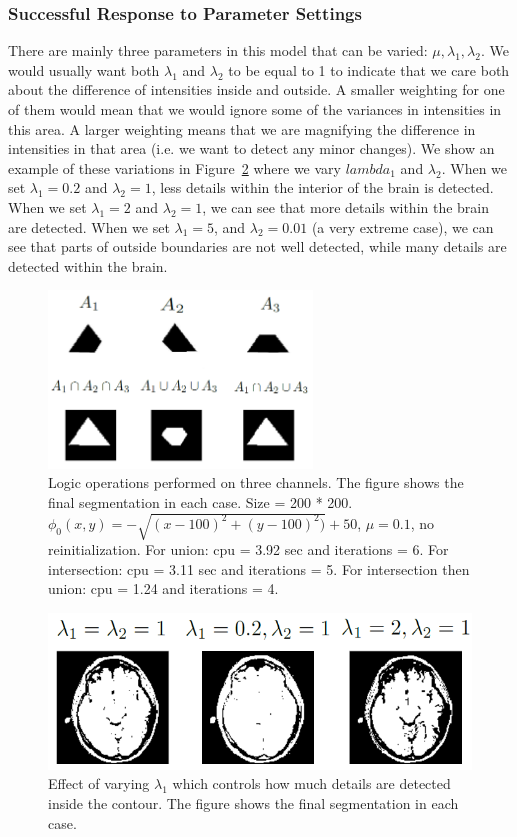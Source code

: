 \documentclass[10pt,twocolumn,letterpaper]{article}
\begin{document}
\subsubsection*{Successful Response to Parameter Settings}

There are mainly three parameters in this model that can be varied: $\mu, \lambda_{1}, \lambda_{2}$. We would usually want both $\lambda_{1}$ and $\lambda_{2}$
to be equal to 1 to indicate that we care both about the difference of intensities inside and outside. A smaller weighting for one of them would mean that we
would ignore some of the variances in intensities in this area. A larger weighting means that we are magnifying the difference in intensities in that area
(i.e. we want to detect any minor changes). We show an example of these variations in Figure~\ref{fig:cv_eg12} where we vary
$lambda_1$ and $\lambda_2$. When we set $\lambda_1 = 0.2$ and $\lambda_2 = 1$, less details within the interior of the brain is detected. When
we set $\lambda_1 = 2$ and $\lambda_2 = 1$, we can see that more details within the brain are detected. When we set $\lambda_1 = 5$, and $\lambda_2 = 0.01$ (a
very extreme case), we can see that parts of outside boundaries are not well detected, while many details are detected within the brain.

\begin{figure}[t]
\centering
\includegraphics[width=7cm]{threech.png}
\caption{Logic operations performed on three channels. The figure shows the final segmentation in each case. Size = 200 * 200. $\phi_{0}(x,y) = - \sqrt{(x -
100)^2 + (y - 100)^2)} + 50$, $\mu = 0.1$, no reinitialization. For union: cpu = 3.92 sec and iterations = 6. For intersection: cpu = 3.11 sec and iterations =
5. For intersection then union: cpu = 1.24 and iterations = 4.}
\label{fig:threech}
\end{figure}

\begin{figure}[t]
\centering
\includegraphics[width=12cm]{cv_eg12.png}
\caption{Effect of varying $\lambda_1$ which controls how much details are detected inside the contour. The figure shows the final segmentation in each case.}
\label{fig:cv_eg12}
\end{figure}
\end{document}
